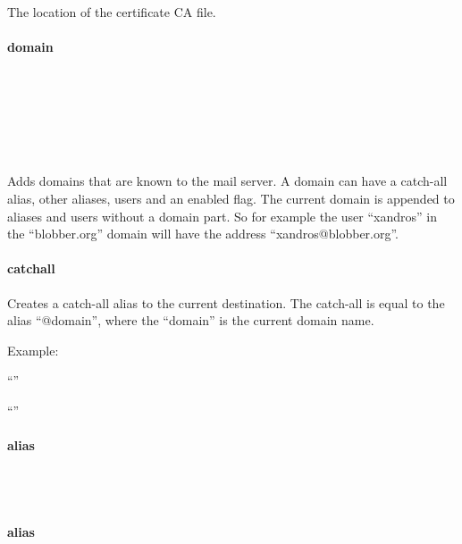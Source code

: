 
The location of the certificate CA file.

\paragraph{domain}

\\
\\
\\
\\
\\
\statement*{\}}

Adds domains that are known to the mail server. A domain can have a catch-all
alias, other aliases, users and an enabled flag. The current domain is appended
to aliases and users without a domain part. So for example the user ``xandros''
in the ``blobber.org'' domain will have the address ``xandros@blobber.org''.

\paragraph{catchall}


Creates a catch-all alias to the current destination. The catch-all is equal
to the alias ``@domain'', where the ``domain'' is the current domain name.

Example:

\begin{compactitem}
\item ``''
\item ``''
\end{compactitem}

\paragraph{alias}

\\
\\

\paragraph{alias}

